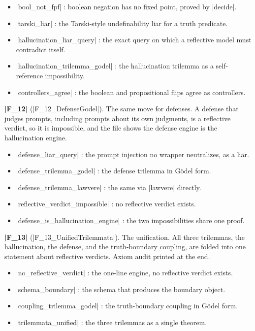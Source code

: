 \documentclass{memoir}
\begin{document}
\begin{itemize}
\item \LeanVerb|bool_not_fpf| : boolean negation has no fixed point, proved by \LeanVerb|decide|.
\item \LeanVerb|tarski_liar| : the Tarski-style undefinability liar for a truth predicate.
\item \LeanVerb|hallucination_liar_query| : the exact query on which a reflective model must
   contradict itself.
\item \LeanVerb|hallucination_trilemma_godel| : the hallucination trilemma as a self-reference
   impossibility.
\item \LeanVerb|controllers_agree| : the boolean and propositional flips agree as controllers.

\end{itemize}


\textbf{\LeanVerb|F_12|} (\LeanVerb|F_12_DefenseGodel|). The same move for defenses. A defense that judges
prompts, including prompts about its own judgments, is a reflective verdict, so it
is impossible, and the file shows the defense engine is the hallucination engine.

\begin{itemize}
\item \LeanVerb|defense_liar_query| : the prompt injection no wrapper neutralizes, as a liar.
\item \LeanVerb|defense_trilemma_godel| : the defense trilemma in Gödel form.
\item \LeanVerb|defense_trilemma_lawvere| : the same via \LeanVerb|lawvere| directly.
\item \LeanVerb|reflective_verdict_impossible| : no reflective verdict exists.
\item \LeanVerb|defense_is_hallucination_engine| : the two impossibilities share one proof.

\end{itemize}


\textbf{\LeanVerb|F_13|} (\LeanVerb|F_13_UnifiedTrilemmata|). The unification. All three trilemmas, the
hallucination, the defense, and the truth-boundary coupling, are folded into one
statement about reflective verdicts. Axiom audit printed at the end.

\begin{itemize}
\item \LeanVerb|no_reflective_verdict| : the one-line engine, no reflective verdict exists.
\item \LeanVerb|schema_boundary| : the schema that produces the boundary object.
\item \LeanVerb|coupling_trilemma_godel| : the truth-boundary coupling in Gödel form.
\item \LeanVerb|trilemmata_unified| : the three trilemmas as a single theorem.

\end{itemize}
\end{document}
